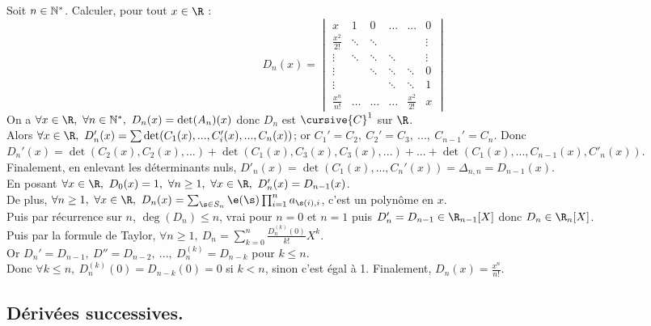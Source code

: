 \documentclass[11pt]{article}
\begin{document}
\begin{exercice}{}{}
    Soit $n\in\mathbb{N}^*$. Calculer, pour tout $x\in \R$ :
    \begin{equation*}
        D_n(x) = \begin{vmatrix}x & 1 & 0 & ... & ... & 0 \\ \frac{x^2}{2!} & \ddots & \ddots & & & \vdots \\ \vdots & \ddots & \ddots & \ddots & & \vdots \\ \vdots & & \ddots & \ddots & \ddots & 0 \\ \vdots & & & \ddots & \ddots & 1 \\ \frac{x^n}{n!} & \dots & \dots & \dots & \frac{x^2}{2!} & x \end{vmatrix}
    \end{equation*}
    \tcblower
    On a $\forall x \in \R, ~ \forall n \in \N^*, ~ D_n(x)=\det(A_n)(x)$ donc $D_n$ est $\cursive{C}^1$ sur $\R$.\\
    Alors $\forall x \in \R, ~ D_n'(x)=\sum\det(C_1(x),...,C_i'(x),...,C_n(x))$; or $C_1'=C_2, ~ C_2'=C_3, ~ ..., ~ C_{n-1}'=C_n$.
    Donc $D_n'(x)=\det(C_2(x),C_2(x),...) + \det(C_1(x),C_3(x),C_3(x),...) + ... + \det(C_1(x), ..., C_{n-1}(x),C'_n(x))$.\\
    Finalement, en enlevant les déterminants nuls, $D'_n(x)=\det(C_1(x),...,C_n'(x))=\Delta_{n,n}=D_{n-1}(x)$.\\
    En posant $\forall x \in \R, ~ D_0(x)=1, ~ \forall n \geq 1, ~ \forall x \in \R, ~ D_n'(x)=D_{n-1}(x)$.\\
    De plus, $\forall n\geq 1, ~ \forall x \in \R, ~ D_n(x)=\sum_{\s\in S_n}\e(\s)\prod_{i=1}^n a_{\s(i),i}$, c'est un polynôme en $x$.\\
    Puis par récurrence sur $n$, $\deg(D_n)\leq n$, vrai pour $n=0$ et $n=1$ puis $D_n'=D_{n-1}\in\R_{n-1}[X]$ donc $D_n\in\R_n[X]$.\\
    Puis par la formule de Taylor, $\forall n \geq 1, ~ D_n=\sum_{k=0}^n\frac{D_n^{(k)}(0)}{k!}X^k$.\\
    Or $D_n'=D_{n-1}, ~ D''=D_{n-2}, ~ ..., ~ D_n^{(k)}=D_{n-k}$ pour $k\leq n$.\\
    Donc $\forall k \leq n, ~ D_n^{(k)}(0)=D_{n-k}(0)=0$ si $k<n$, sinon c'est égal à 1. Finalement, $D_n(x)=\frac{x^n}{n!}$.
\end{exercice}

\subsection{Dérivées successives.}
\end{document}

